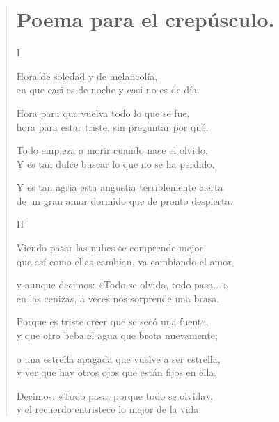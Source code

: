 \documentclass[11pt, portrait, twoside, notitlepage, openright]{book}
\begin{document}
\newpage
\begin{verse}
\begin{center}
\section{Poema para el crepúsculo.}
\end{center}
\begin{center}
I
\end{center}

Hora de soledad y de melancolía,\\
en que casi es de noche y casi no es de día.
\newline

Hora para que vuelva todo lo que se fue,\\
hora para estar triste, sin preguntar por qué.
\newline

Todo empieza a morir cuando nace el olvido.\\
Y es tan dulce buscar lo que no se ha perdido.
\newline

Y es tan agria esta angustia terriblemente cierta\\
de un gran amor dormido que de pronto despierta.

\begin{center}
II
\end{center}

Viendo pasar las nubes se comprende mejor\\
que así como ellas cambian, va cambiando el amor,
\newline

y aunque decimos: «Todo se olvida, todo pasa...»,\\
en las cenizas, a veces nos sorprende una brasa.
\newline

Porque es triste creer que se secó una fuente,\\
y que otro beba el agua que brota nuevamente;
\newpage

o una estrella apagada que vuelve a ser estrella,\\
y ver que hay otros ojos que están fijos en ella.
\newline

Decimos: «Todo pasa, porque todo se olvida»,\\
y el recuerdo entristece lo mejor de la vida.
\newline


\end{verse}
\end{document}

